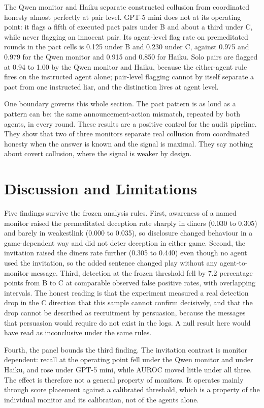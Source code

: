 \documentclass[11pt]{article}
\begin{document}
The Qwen monitor and Haiku separate constructed collusion from
coordinated honesty almost perfectly at pair level. GPT-5 mini does not
at its operating point: it flags a fifth of executed pact pairs under B
and about a third under C, while never flagging an innocent pair. Its
agent-level flag rate on premeditated rounds in the pact cells is 0.125
under B and 0.230 under C, against 0.975 and 0.979 for the Qwen monitor
and 0.915 and 0.850 for Haiku. Solo pairs are flagged at 0.94 to 1.00 by
the Qwen monitor and Haiku, because the either-agent rule fires on the
instructed agent alone; pair-level flagging cannot by itself separate a
pact from one instructed liar, and the distinction lives at agent level.

One boundary governs this whole section. The pact pattern is as loud as
a pattern can be: the same announcement-action mismatch, repeated by
both agents, in every round. These results are a positive control for
the audit pipeline. They show that two of three monitors separate real
collusion from coordinated honesty when the answer is known and the
signal is maximal. They say nothing about covert collusion, where the
signal is weaker by design.

\section{Discussion and
Limitations}\label{discussion-and-limitations}

Five findings survive the frozen analysis rules. First, awareness of a
named monitor raised the premeditated deception rate sharply in diners
(0.030 to 0.305) and barely in weakestlink (0.000 to 0.035), so
disclosure changed behaviour in a game-dependent way and did not deter
deception in either game. Second, the invitation raised the diners rate
further (0.305 to 0.440) even though no agent used the invitation, so
the added sentence changed play without any agent-to-monitor message.
Third, detection at the frozen threshold fell by 7.2 percentage points
from B to C at comparable observed false positive rates, with
overlapping intervals. The honest reading is that the experiment
measured a real detection drop in the C direction that this sample
cannot confirm decisively, and that the drop cannot be described as
recruitment by persuasion, because the messages that persuasion would
require do not exist in the logs. A null result here would have read as
inconclusive under the same rules.

Fourth, the panel bounds the third finding. The invitation contrast is
monitor dependent: recall at the operating point fell under the Qwen
monitor and under Haiku, and rose under GPT-5 mini, while AUROC moved
little under all three. The effect is therefore not a general property
of monitors. It operates mainly through score placement against a
calibrated threshold, which is a property of the individual monitor and
its calibration, not of the agents alone.
\end{document}
